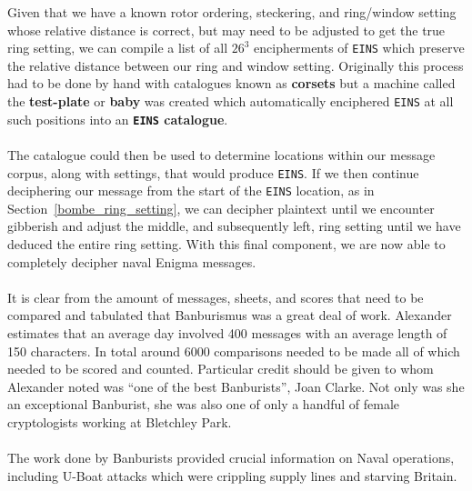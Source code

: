   \noindent Given that we have a known rotor ordering, steckering,
  and ring/window setting whose relative distance is correct, but may
  need to be adjusted to get the true ring setting, we can compile a
  list of all $26^3$ encipherments of \texttt{EINS} which preserve
  the relative distance between our ring and window setting.
  Originally this process had to be done by hand with catalogues
  known as {\bf{corsets}} but a machine called the {\bf{test-plate}}
  or {\bf{baby}} was created which automatically enciphered
  \texttt{EINS} at all such positions into an {\bf{\texttt{EINS} catalogue}}.
  \\\\The catalogue could then be used to determine locations within our
  message corpus, along with settings, that would produce
  \texttt{EINS}. If we then continue deciphering our message from the
  start of the \texttt{EINS} location, as in Section~\ref{bombe_ring_setting}, we can decipher plaintext until we encounter gibberish and adjust the middle, and subsequently left, ring setting
  until we have deduced the entire ring setting. With this final
  component, we are now able to completely decipher naval Enigma messages.
  \\\\It is clear from the amount of messages, sheets, and scores
  that need to be compared and tabulated that Banburismus was a great
  deal of work. Alexander estimates that an average day involved 400
  messages with an average length of 150 characters. In total around
  6000 comparisons needed to be made all of which needed to be scored
  and counted. Particular credit should be given to whom Alexander
  noted was ``one of the best Banburists'', Joan Clarke. Not only was
  she an exceptional Banburist, she was also one of only a handful of
  female cryptologists working at Bletchley Park.
  \\\\The work done by Banburists provided crucial information on
  Naval operations, including U-Boat attacks which were crippling
  supply lines and starving Britain.


